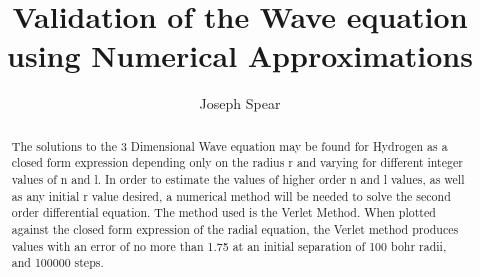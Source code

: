 \documentclass{article}
\begin{document}
\title{Validation of the Wave equation using Numerical Approximations}
\author{Joseph Spear}

\maketitle


\begin{abstract}
\justify
The solutions to the 3 Dimensional Wave equation may be found for Hydrogen as a closed form expression depending only on the radius r and varying for different integer values of n and l. In order to estimate the values of higher order n and l values, as well as any initial r value desired, a numerical method will be needed to solve the second order differential equation. The method used is the Verlet Method. When plotted against the closed form expression of the radial equation, the Verlet method produces values with an error of no more than 1.75 at an initial separation of 100 bohr radii, and 100000 steps.

\end{abstract}
\end{document}
